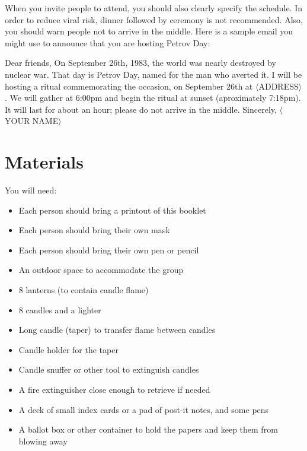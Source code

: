 \documentclass{article}
\begin{document}
When you invite people to attend, you should also clearly specify the
schedule. In order to reduce viral risk, dinner followed by ceremony is not
recommended. Also, you should warn people not to arrive in the middle. Here is
a sample email you might use to announce that you are hosting Petrov Day:

\begin{center}
	\parbox{4.5in}{
	Dear friends,\newline
	On September 26th, 1983, the world was nearly destroyed by nuclear war.
	That day is Petrov Day, named for the man who averted it. I will be
	hosting a ritual commemorating the occasion, on September 26th at
	$\langle$ADDRESS$\rangle$. We will gather at 6:00pm and begin the ritual
	at sunset (aproximately 7:18pm). It will last for about an hour; please do
	not arrive in the middle.\newline
	Sincerely,\newline
	$\langle$YOUR NAME$\rangle$}
\end{center}

\section{Materials}
You will need:

\begin{itemize} \itemsep0pt \parskip0pt 
    \item Each person should bring a printout of this booklet
    \item Each person should bring their own mask
    \item Each person should bring their own pen or pencil
    \item An outdoor space to accommodate the group
    \item 8 lanterns (to contain candle flame)
	\item 8 candles and a lighter
    \item Long candle (taper) to transfer flame between candles
    \item Candle holder for the taper
    \item Candle snuffer or other tool to extinguish candles
	\item A fire extinguisher close enough to retrieve if needed
	\item A deck of small index cards or a pad of post-it notes, and some pens
	\item A ballot box or other container to hold the papers and keep them from
blowing away
\end{itemize}
\end{document}
